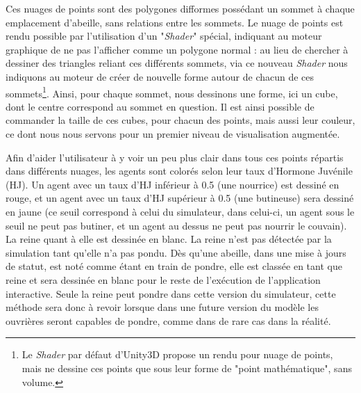 		Ces nuages de points sont des polygones difformes possédant un sommet à chaque emplacement d'abeille, sans relations entre les sommets. Le nuage de points est rendu possible par l'utilisation d'un "\textit{Shader}" spécial, indiquant au moteur graphique de ne pas l'afficher comme un polygone normal : au lieu de chercher à dessiner des triangles reliant ces différents sommets, via ce nouveau \textit{Shader} nous indiquons au moteur de créer de nouvelle forme autour de chacun de ces sommets\footnote{Le \textit{Shader} par défaut d'Unity3D propose un rendu pour nuage de points, mais ne dessine ces points que sous leur forme de "point mathématique", sans volume.}. Ainsi, pour chaque sommet, nous dessinons une forme, ici un cube, dont le centre correspond au sommet en question. Il est ainsi possible de commander la taille de ces cubes, pour chacun des points, mais aussi leur couleur, ce dont nous nous servons pour un premier niveau de visualisation augmentée. 
		
		Afin d'aider l'utilisateur à y voir un peu plus clair dans tous ces points répartis dans différents nuages, les agents sont colorés selon leur taux d'Hormone Juvénile (HJ). Un agent avec un taux d'HJ inférieur à 0.5 (une nourrice) est dessiné en rouge, et un agent avec un taux d'HJ supérieur à 0.5 (une butineuse) sera dessiné en jaune (ce seuil correspond à celui du simulateur, dans celui-ci, un agent sous le seuil ne peut pas butiner, et un agent au dessus ne peut pas nourrir le couvain). La reine quant à elle est dessinée en blanc. La reine n'est pas détectée par la simulation tant qu'elle n'a pas pondu. Dès qu'une abeille, dans une mise à jours de statut, est noté comme étant en train de pondre, elle est classée en tant que reine et sera dessinée en blanc pour le reste de l'exécution de l'application interactive. Seule la reine peut pondre dans cette version du simulateur, cette méthode sera donc à revoir lorsque dans une future version du modèle les ouvrières seront capables de pondre, comme dans de rare cas dans la réalité.
		
